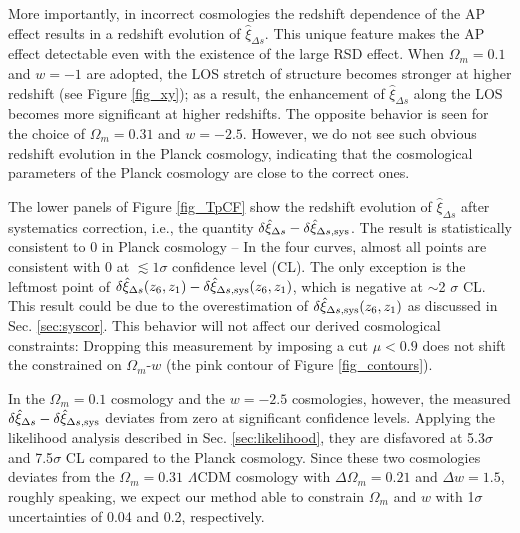 \documentclass[iop]{emulateapj}
\begin{document}
More importantly, in incorrect cosmologies the redshift dependence of the AP effect results in a redshift evolution of $\hat \xi_{\Delta s}$.
This unique feature makes the AP effect detectable even with the existence of the large RSD effect. %
When $\Omega_m=0.1$ and $w=-1$ are adopted, 
the LOS stretch of structure becomes stronger at higher redshift (see Figure \ref{fig_xy});
as a result, the enhancement of $\hat \xi_{\Delta s}$ along the LOS 
becomes more significant at higher redshifts.
The opposite behavior is seen for the choice of $\Omega_m=0.31$ and $w=-2.5$.
However, we do not see such obvious redshift evolution in the Planck cosmology, %
 indicating that the cosmological parameters of the Planck cosmology are close to the correct ones.

The lower panels of Figure \ref{fig_TpCF} show the redshift evolution of $\hat\xi_{\Delta s}$ after systematics correction, 
i.e., the quantity $\delta\hat \xi_{\Delta s}-\delta\hat \xi_{\Delta s,\rm sys}$.
The result is statistically consistent to 0 in Planck cosmology -- 
In the four curves, almost all points are consistent with 0 at $\lesssim1\sigma$ confidence level (CL).
The only exception is the leftmost point of $\delta\hat \xi_{\Delta s}(z_6,z_1)-\delta\hat \xi_{\Delta s,\rm sys}(z_6,z_1)$,
 which is negative at $\sim$2 $\sigma$ CL.
This result could be due to the overestimation of $\delta\hat\xi_{\Delta s, \rm sys}(z_6,z_1)$ as discussed in Sec. \ref{sec:syscor}.
This behavior will not affect our derived cosmological constraints:
Dropping this measurement by imposing a cut $\mu<0.9$
  does not shift the constrained on $\Omega_m$-$w$ (the pink contour of Figure \ref{fig_contours}).

In the $\Omega_m=0.1$ cosmology and the $w=-2.5$ cosmologies, however,
the measured $\delta\hat \xi_{\Delta s}-\delta\hat \xi_{\Delta s,\rm sys}$ deviates 
from zero at significant confidence levels.
Applying the likelihood analysis described in Sec. \ref{sec:likelihood},
 they are disfavored at 5.3$\sigma$ and 7.5$\sigma$ CL compared to the Planck cosmology.
Since these two cosmologies deviates from the $\Omega_m=0.31$ $\Lambda$CDM cosmology with $\Delta \Omega_m = 0.21$ and $\Delta w = 1.5$,
roughly speaking, we expect our method able to constrain $\Omega_m$ and $w$ with 1$\sigma$ uncertainties of 0.04 and 0.2, respectively.
\end{document}
